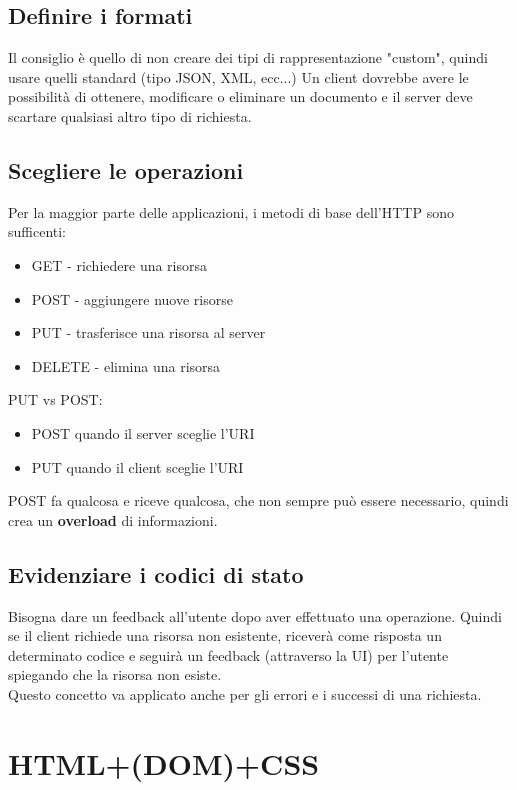 \documentclass[12pt, a4paper]{article}
\begin{document}
    \subsection*{Definire i formati}
    Il consiglio è quello di non creare dei tipi di rappresentazione "custom", quindi usare quelli standard (tipo JSON, XML, ecc...)
    Un client dovrebbe avere le possibilità di ottenere, modificare o eliminare un documento e il server
    deve scartare qualsiasi altro tipo di richiesta.
    \subsection*{Scegliere le operazioni}
    Per la maggior parte delle applicazioni, i metodi di base dell'HTTP sono sufficenti:
    \begin{itemize}
        \item GET - richiedere una risorsa
        \item POST - aggiungere nuove risorse
        \item PUT - trasferisce una risorsa al server
        \item DELETE - elimina una risorsa
    \end{itemize}
    PUT vs POST: 
    \begin{itemize}
        \item POST quando il server sceglie l'URI
        \item PUT quando il client sceglie l'URI
    \end{itemize}
    POST fa qualcosa e riceve qualcosa, che non sempre può essere necessario, quindi crea un \textbf{overload} di informazioni.
    \subsection*{Evidenziare i codici di stato}
    Bisogna dare un feedback all'utente dopo aver effettuato una operazione. 
    Quindi se il client richiede una risorsa non esistente, riceverà come risposta un determinato codice e seguirà
    un feedback (attraverso la UI) per l'utente spiegando che la risorsa non esiste.
    \\Questo concetto va applicato anche per gli errori e i successi di una richiesta.

    \newpage
    \section{HTML+(DOM)+CSS}
\end{document}
